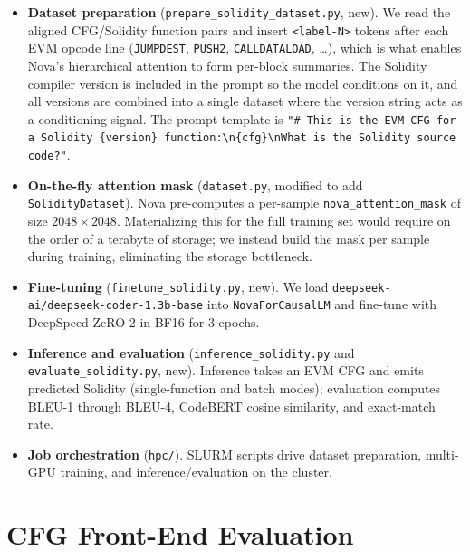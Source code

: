 \documentclass{stylefiles/capstone}
\begin{document}
\begin{itemize}
  \item \textbf{Dataset preparation} (\texttt{prepare\_solidity\_dataset.py}, new).
        We read the aligned CFG/Solidity function pairs and insert
        \texttt{<label-N>} tokens after each EVM opcode line (\texttt{JUMPDEST},
        \texttt{PUSH2}, \texttt{CALLDATALOAD}, \dots), which is what enables Nova's
        hierarchical attention to form per-block summaries. The Solidity compiler
        version is included in the prompt so the model conditions on it, and all
        versions are combined into a single dataset where the version string acts
        as a conditioning signal. The prompt template is
        \texttt{"\# This is the EVM CFG for a Solidity \{version\} function:\textbackslash n\{cfg\}\textbackslash nWhat is the Solidity source code?"}.
  \item \textbf{On-the-fly attention mask} (\texttt{dataset.py}, modified to add
        \texttt{SolidityDataset}). Nova pre-computes a per-sample
        \texttt{nova\_attention\_mask} of size $2048\times2048$. Materializing this
        for the full training set would require on the order of a terabyte of
        storage; we instead build the mask per sample during training, eliminating
        the storage bottleneck.
  \item \textbf{Fine-tuning} (\texttt{finetune\_solidity.py}, new). We load
        \texttt{deepseek-ai/deepseek-coder-1.3b-base} into
        \texttt{NovaForCausalLM} and fine-tune with DeepSpeed ZeRO-2 in BF16 for
        $3$ epochs.
  \item \textbf{Inference and evaluation} (\texttt{inference\_solidity.py} and
        \texttt{evaluate\_solidity.py}, new). Inference takes an EVM CFG and emits
        predicted Solidity (single-function and batch modes); evaluation computes
        BLEU-1 through BLEU-4, CodeBERT cosine similarity, and exact-match rate.
  \item \textbf{Job orchestration} (\texttt{hpc/}). SLURM scripts drive dataset
        preparation, multi-GPU training, and inference/evaluation on the cluster.
\end{itemize}

\section{CFG Front-End Evaluation}
\label{sec:cfg-eval}
\end{document}
